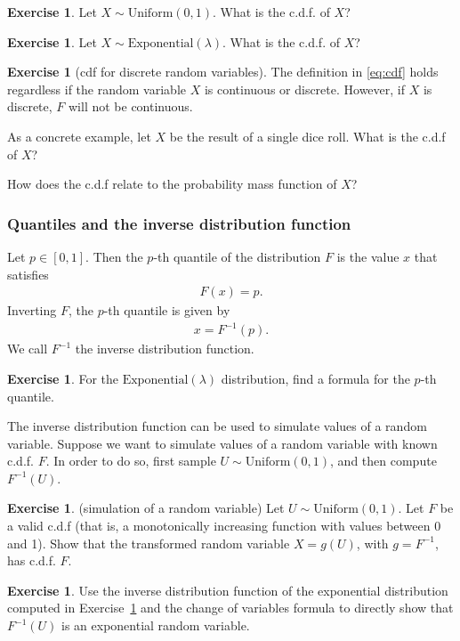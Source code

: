 \documentclass[11pt]{article}
\theoremstyle{definition}
\newtheorem{exercise}[]{Exercise}
\begin{document}
\begin{exercise} Let $X\sim \text{Uniform}(0, 1)$.
  What is the c.d.f. of $X$?
\end{exercise}

\begin{exercise} Let $X\sim \text{Exponential}(\lambda)$.
  What is the c.d.f. of $X$?
\end{exercise}

\begin{exercise}[cdf for discrete random variables]
  The definition in \eqref{eq:cdf} holds
  regardless if the random variable $X$ is continuous
  or discrete. However, if $X$ is discrete, $F$
  will not be continuous.

  As a concrete example, let $X$ be the result of a
  single dice roll. What is the c.d.f of $X$?

  How does the c.d.f relate to the probability mass
  function of $X$?

\end{exercise}


\subsubsection*{Quantiles and
the inverse distribution function}

Let $p\in[0, 1]$. Then the $p$-th quantile of
the distribution $F$ is the value $x$ that
satisfies
\begin{align*}
  F(x) = p.
\end{align*}
Inverting $F$, the $p$-th quantile is given by
\begin{align*}
  x = F^{-1}(p).
\end{align*}
We call $F^{-1}$ the inverse distribution function.

\begin{exercise}
  For the $\text{Exponential}(\lambda)$ distribution,
  find a formula for the $p$-th quantile.
  \label{ex:exp_inv_cdf}
\end{exercise}

The inverse distribution function can be used to
simulate values of a random variable.
Suppose we want to simulate values of a random variable
with known c.d.f. $F$.
In order to do so, first sample $U\sim\text{Uniform}(0, 1)$, and then compute $F^{-1}(U)$.

\begin{exercise}(simulation of a random variable)
Let $U\sim\text{Uniform}(0, 1)$.
Let $F$ be a valid c.d.f
(that is, a monotonically increasing function
with values between 0 and 1). Show that
the transformed random variable $X = g(U)$,
with $g = F^{-1}$, has c.d.f. $F$.
\end{exercise}

\begin{exercise}
  Use the inverse distribution function of
  the exponential distribution computed in
  Exercise~\ref{ex:exp_inv_cdf} and the change of
  variables formula to directly show that
  $F^{-1}(U)$ is an exponential random variable.
\end{exercise}
\end{document}
